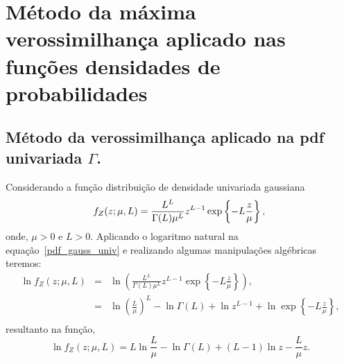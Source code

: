 \section{Método da máxima verossimilhança aplicado nas funções densidades de probabilidades}

\subsection{Método da verossimilhança aplicado na pdf univariada $\Gamma$.}
Considerando a função distribuição de densidade univariada gaussiana 
\begin{equation}\label{pdf_gauss_univ}
	f_{Z}(z;\mu,L)=\frac{L^{L}}{\Gamma(L)\mu^{L}} z^{L-1}\exp\left\{-L\frac{z}{\mu}\right\}, \\
\end{equation}
onde, $\mu>0$ e $L>0$. Aplicando o logaritmo natural na equação~\eqref{pdf_gauss_univ}  e realizando algumas manipulações algébricas teremos:
\begin{equation}\nonumber
\begin{array}{ccl}
	\ln f_{Z}(z;\mu,L)&=&\ln \left(\frac{L^{L}}{\Gamma(L)\mu^{L}} z^{L-1}\exp\left\{-L\frac{z}{\mu}\right\}\right), \\
	                                         &=&\ln\left(\frac{L}{\mu}\right)^L-\ln\Gamma(L)+ \ln z^{L-1} + \ln \exp\left\{-L\frac{z}{\mu}\right\}, \\
\end{array}
\end{equation}
resultanto na função,
\begin{equation}\label{func_log_univ_gaussiana}
	\ln f_{Z}(z;\mu,L)=L\ln\frac{L}{\mu}-\ln\Gamma(L)+(L-1)\ln z - \frac{L}{\mu} z.
\end{equation}

